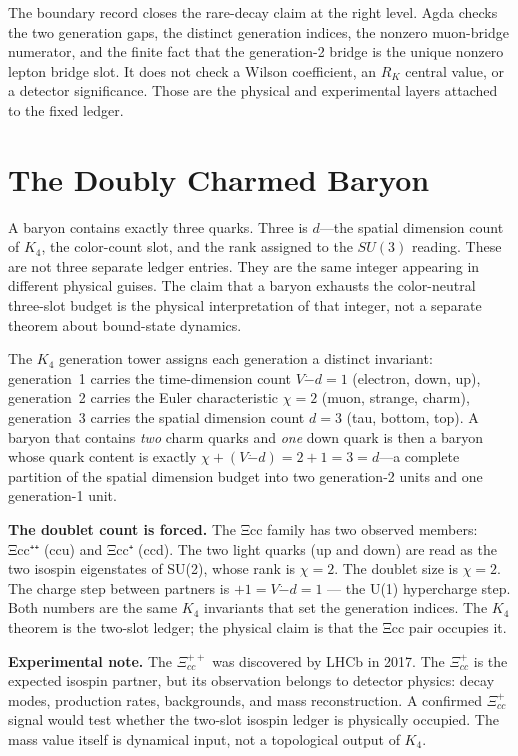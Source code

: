 \documentclass[11pt,a4paper]{book}
\begin{document}
The boundary record closes the rare-decay claim at the right level.  Agda
checks the two generation gaps, the distinct generation indices, the nonzero
muon-bridge numerator, and the finite fact that the generation-2 bridge is the
unique nonzero lepton bridge slot.  It does not check a Wilson coefficient, an
$R_K$ central value, or a detector significance.  Those are the physical and
experimental layers attached to the fixed ledger.

\section{The Doubly Charmed Baryon}
\label{sec:doubly-charmed-baryon}

A baryon contains exactly three quarks. Three is $d$---the spatial dimension count of $K_4$, the color-count slot, and the rank assigned to the $SU(3)$ reading. These are not three separate ledger entries. They are the same integer appearing in different physical guises. The claim that a baryon exhausts the color-neutral three-slot budget is the physical interpretation of that integer, not a separate theorem about bound-state dynamics.

The $K_4$ generation tower assigns each generation a distinct invariant: generation~1 carries the time-dimension count $V \dot{-} d = 1$ (electron, down, up), generation~2 carries the Euler characteristic $\chi = 2$ (muon, strange, charm), generation~3 carries the spatial dimension count $d = 3$ (tau, bottom, top). A baryon that contains \emph{two} charm quarks and \emph{one} down quark is then a baryon whose quark content is exactly $\chi + (V \dot{-} d) = 2 + 1 = 3 = d$---a complete partition of the spatial dimension budget into two generation-2 units and one generation-1 unit.

\textbf{The doublet count is forced.} The Ξcc family has two observed members: Ξcc⁺⁺ (ccu) and Ξcc⁺ (ccd). The two light quarks (up and down) are read as the two isospin eigenstates of SU(2), whose rank is $\chi = 2$. The doublet size is $\chi = 2$. The charge step between partners is $+1 = V \dot{-} d = 1$ --- the U(1) hypercharge step. Both numbers are the same $K_4$ invariants that set the generation indices. The $K_4$ theorem is the two-slot ledger; the physical claim is that the Ξcc pair occupies it.

\textbf{Experimental note.} The $\Xi_{cc}^{++}$ was discovered by LHCb in 2017. The $\Xi_{cc}^{+}$ is the expected isospin partner, but its observation belongs to detector physics: decay modes, production rates, backgrounds, and mass reconstruction. A confirmed $\Xi_{cc}^{+}$ signal would test whether the two-slot isospin ledger is physically occupied. The mass value itself is dynamical input, not a topological output of $K_4$.
\end{document}
